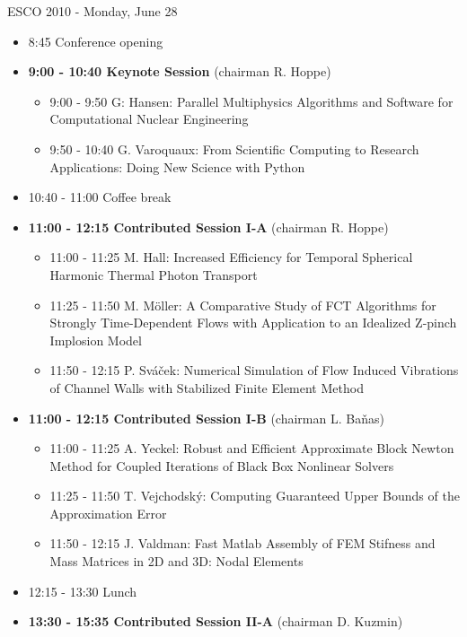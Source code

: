 \documentclass[10pt, A4]{article}%
\begin{document}
\centerline{\huge ESCO 2010 - Monday, June 28}
\vspace{4mm}

\begin{itemize}    
  \item 8:45 Conference opening
  \item {\bf 9:00 - 10:40 Keynote Session} (chairman R. Hoppe) 
  \begin{itemize}
    \item 9:00 - 9:50 G: Hansen: Parallel Multiphysics Algorithms and Software for Computational Nuclear Engineering
    \item 9:50 - 10:40 G. Varoquaux: From Scientific Computing to Research Applications: Doing New Science with Python
  \end{itemize}
  \item 10:40 - 11:00 Coffee break
  \item {\bf 11:00 - 12:15 Contributed Session I-A} (chairman R. Hoppe) 
  \begin{itemize}
    \item 11:00 - 11:25 M. Hall: Increased Efficiency for  Temporal Spherical Harmonic Thermal Photon Transport
    \item 11:25 - 11:50  M. M\"oller: A Comparative Study of FCT Algorithms for Strongly Time-Dependent Flows with Application to an Idealized Z-pinch Implosion Model 
    \item 11:50 - 12:15 P. Sv\'a\v{c}ek: Numerical Simulation of Flow Induced Vibrations of Channel Walls with Stabilized Finite Element Method
  \end{itemize}
  \item {\bf 11:00 - 12:15 Contributed Session I-B} (chairman L. Ba\v nas) 
  \begin{itemize}
    \item 11:00 - 11:25 A. Yeckel: Robust and Efficient Approximate Block Newton Method for Coupled Iterations of Black Box Nonlinear Solvers
    \item 11:25 - 11:50 T. Vejchodsk\'y: Computing Guaranteed Upper Bounds of the Approximation Error
    \item 11:50 - 12:15 J. Valdman: Fast Matlab Assembly of FEM Stifness and Mass Matrices in 2D and 3D: Nodal Elements
  \end{itemize}
  \item 12:15 - 13:30 Lunch
  \item {\bf 13:30 - 15:35 Contributed Session II-A} (chairman D. Kuzmin) 
  \begin{itemize}

\end{itemize}
\end{itemize}
\end{document}

